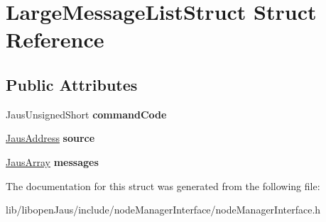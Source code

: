 \hypertarget{struct_large_message_list_struct}{\section{\-Large\-Message\-List\-Struct \-Struct \-Reference}
\label{struct_large_message_list_struct}
}
\subsection*{\-Public \-Attributes}
\begin{DoxyCompactItemize}
\item 
\hypertarget{struct_large_message_list_struct_a11e5a751e05f41e9aef25a469fb80cf3}{\-Jaus\-Unsigned\-Short {\bfseries command\-Code}}\label{struct_large_message_list_struct_a11e5a751e05f41e9aef25a469fb80cf3}

\item 
\hypertarget{struct_large_message_list_struct_aadb9a002b01e63ce4e391a2e19964383}{\hyperlink{struct_jaus_address_struct}{\-Jaus\-Address} {\bfseries source}}\label{struct_large_message_list_struct_aadb9a002b01e63ce4e391a2e19964383}

\item 
\hypertarget{struct_large_message_list_struct_a321d87f8bb05e956a26dbe64313e8280}{\hyperlink{struct_jaus_array_struct}{\-Jaus\-Array} {\bfseries messages}}\label{struct_large_message_list_struct_a321d87f8bb05e956a26dbe64313e8280}

\end{DoxyCompactItemize}


\-The documentation for this struct was generated from the following file\-:\begin{DoxyCompactItemize}
\item 
lib/libopen\-Jaus/include/node\-Manager\-Interface/node\-Manager\-Interface.\-h\end{DoxyCompactItemize}
